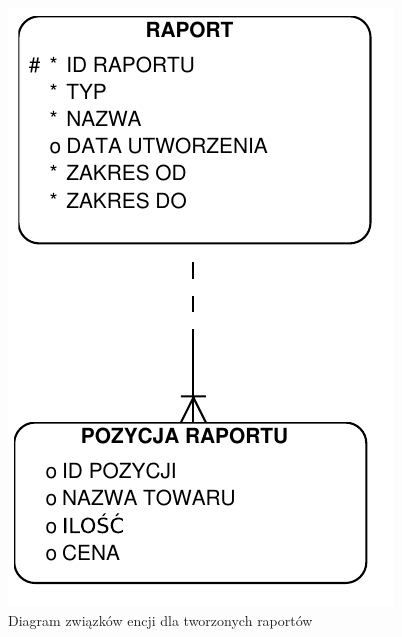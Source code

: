 \begin{figure}[!htb]
  \begin{center}
    \includegraphics[scale=0.7]{../img/model/diagram_er_raporty.pdf}
  \end{center}
  \caption{Diagram związków encji dla tworzonych raportów}
  \label{fig:raport-er}
\end{figure}
\FloatBarrier



